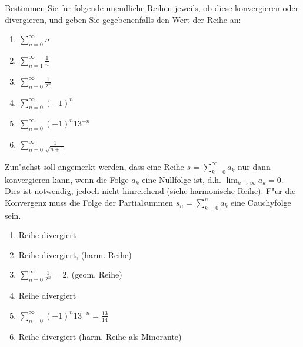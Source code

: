 \documentclass[12pt,answers]{exam}
\begin{document}
\begin{questions}
Bestimmen Sie für folgende unendliche Reihen jeweils, ob diese konvergieren oder divergieren, und geben Sie gegebenenfalls den Wert der Reihe an:\\
\parbox{0.5\textwidth}{\begin{enumerate}
\item $\sum_{n=0}^\infty n$
\item $\sum_{n=1}^\infty \frac{1}{n}$
\item $\sum_{n=0}^\infty \frac{1}{2^n}$
\end{enumerate}}\parbox{0.5\textwidth}{\begin{enumerate}\setcounter{enumi}{3}
\item $\sum_{n=0}^\infty (-1)^n$
\item $\sum_{n=0}^\infty (-1)^n 13^{-n}$
\item $\sum_{n=0}^\infty \frac{1}{\sqrt{n+1}}$
\end{enumerate}}
\begin{solution} Zun"achst soll angemerkt werden, dass eine Reihe 
$s=\sum_{k=0}^\infty a_k$ nur dann konvergieren kann, 
wenn die Folge $a_k$ eine Nullfolge ist, d.h. $\lim_{k\to\infty}a_k=0$. 
Dies ist notwendig, jedoch nicht hinreichend (siehe harmonische Reihe). 
F"ur die Konvergenz muss die Folge der Partialsummen $s_n=\sum_{k=0}^n a_k$ eine Cauchyfolge sein.
\\
\parbox{0.5\textwidth}{\begin{enumerate}
\item Reihe divergiert
\item Reihe divergiert, (harm. Reihe)
\item $\sum_{n=0}^\infty \frac{1}{2^n}=2$, (geom. Reihe)
\end{enumerate}}\parbox{0.5\textwidth}{\begin{enumerate}\setcounter{enumi}{3}
\item Reihe divergiert
\item $\sum_{n=0}^\infty (-1)^n 13^{-n}=\frac{13}{14}$
\item Reihe divergiert (harm. Reihe als Minorante)
\end{enumerate}}
\end{solution}


\end{questions}
\end{document}

